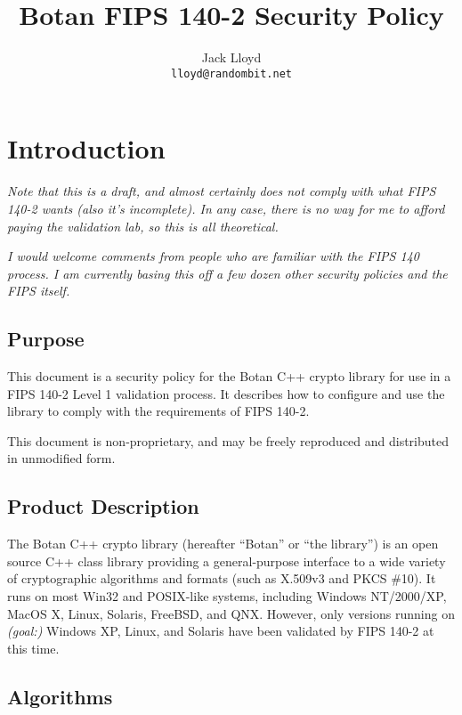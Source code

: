 \documentclass{article}
\title{\textbf{Botan FIPS 140-2 Security Policy}}
\author{Jack Lloyd \\
        \texttt{lloyd@randombit.net}}
\date{}
\begin{document}
\maketitle

\tableofcontents

\parskip=5pt

\pagebreak

\section{Introduction}

\emph{Note that this is a draft, and almost certainly does not comply with what
FIPS 140-2 wants (also it's incomplete). In any case, there is no way for me to
afford paying the validation lab, so this is all theoretical.}

\emph{I would welcome comments from people who are familiar with the FIPS 140
process. I am currently basing this off a few dozen other security policies and
the FIPS itself.}

\subsection{Purpose}

This document is a security policy for the Botan C++ crypto library for use in
a FIPS 140-2 Level 1 validation process. It describes how to configure and use
the library to comply with the requirements of FIPS 140-2.

This document is non-proprietary, and may be freely reproduced and distributed
in unmodified form.

\subsection{Product Description}

The Botan C++ crypto library (hereafter ``Botan'' or ``the library'') is an
open source C++ class library providing a general-purpose interface to a wide
variety of cryptographic algorithms and formats (such as X.509v3 and PKCS
\#10). It runs on most Win32 and POSIX-like systems, including Windows
NT/2000/XP, MacOS X, Linux, Solaris, FreeBSD, and QNX. However, only versions
running on \emph{(goal:)} Windows XP, Linux, and Solaris have been validated by
FIPS 140-2 at this time.

\subsection{Algorithms}
\end{document}
